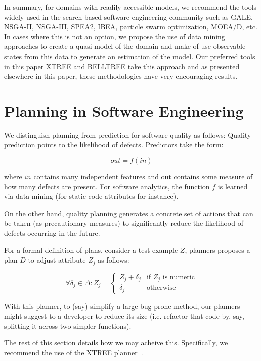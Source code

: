 \documentclass[conference]{IEEEtran}
\begin{document}
In summary, for domains with readily accessible models, we recommend
the tools widely used in the search-based
software engineering community such as GALE, NSGA-II, NSGA-III, SPEA2, IBEA, particle swarm optimization, MOEA/D, etc. In cases where this is not an option, we propose the use of data mining approaches to create a quasi-model of the domain 
and make of use observable states from this data to generate an estimation of the model. Our preferred tools in this paper XTREE and BELLTREE take this approach and as presented elsewhere in this paper, these methodologies have very encouraging results.

\section{Planning in Software Engineering}

We distinguish planning from prediction for software quality as follows: 
Quality prediction points to the likelihood of defects. Predictors take the form:

\begin{equation*}
    out = f(in)    
\end{equation*}

where $in$ contains many independent features and out contains some measure of
how many defects are present. For software analytics, the function $f$ is learned via data mining (for static code attributes for instance).

On the other hand, quality planning generates a concrete set of actions that can be taken (as precautionary measures) to significantly reduce the likelihood of defects occurring in the future.

For a formal definition of plans, consider a test example $Z$, planners
proposes a plan $D$ to adjust attribute $Z_j$ as follows:

{\small\[
\forall \delta_j \in \Delta :  Z_j =  
\begin{cases}
     Z_j + \delta_j& \text{if $Z_j$ is numeric}\\
    \delta_j              & \text{otherwise}
\end{cases}
\]}

With this planner, to (say) simplify a large bug-prone method, our planners
might suggest to a developer to reduce its size (i.e. refactor that
code by, say, splitting it across two simpler functions).

The rest of this section details how we may acheive this. Specifically, we recommend the use of the XTREE planner~\cite{krishna17a}.
\end{document}
